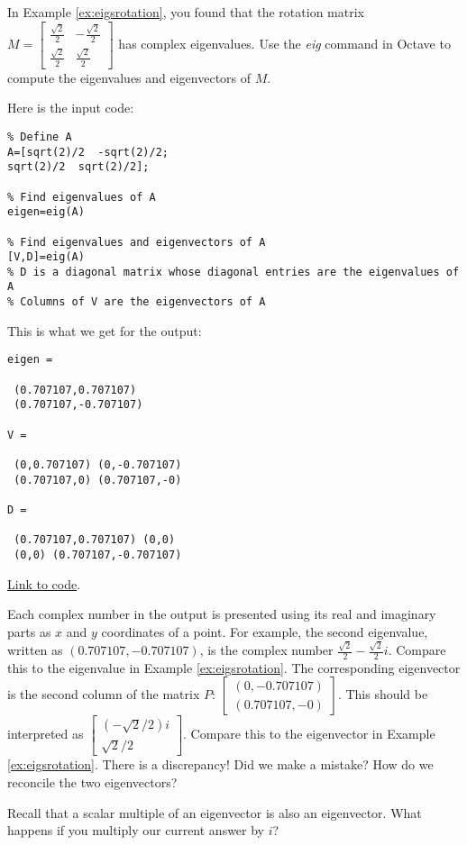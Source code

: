 \documentclass{ximera}
\begin{document}
\begin{example}\label{ex:complexEig}
In Example \ref{ex:eigsrotation}, you found that the rotation matrix $M=\begin{bmatrix}
\frac{\sqrt{2}}{2} & -\frac{\sqrt{2}}{2}\\
\frac{\sqrt{2}}{2} & \frac{\sqrt{2}}{2}
\end{bmatrix}$ has complex eigenvalues.  Use the \emph{eig} command in Octave to compute the eigenvalues and eigenvectors of $M$.  

\begin{explanation}
Here is the input code:

\begin{verbatim}
% Define A
A=[sqrt(2)/2  -sqrt(2)/2;
sqrt(2)/2  sqrt(2)/2];

% Find eigenvalues of A
eigen=eig(A)

% Find eigenvalues and eigenvectors of A
[V,D]=eig(A)
% D is a diagonal matrix whose diagonal entries are the eigenvalues of A
% Columns of V are the eigenvectors of A
\end{verbatim}

This is what we get for the output:
\begin{verbatim}
eigen =

 (0.707107,0.707107)
 (0.707107,-0.707107)

V =

 (0,0.707107) (0,-0.707107)
 (0.707107,0) (0.707107,-0)

D =

 (0.707107,0.707107) (0,0)
 (0,0) (0.707107,-0.707107)
\end{verbatim}

\href{https://sagecell.sagemath.org/?z=eJx1jkEKgzAURPeB3GE2AYWWgtviQio9ghtxEepXAzHBGNsev1FoKqXdfOY_ZoYRKKlThlBwVuT1PDmfZOkpA45Rnznb8SibwDkTuCrTglRP5i71QjNst7ZtJA83KdI_Rhl_unnr3sm6OpRNTAqUUMGLVsneGqkxSu_UE4_BzvShZAJdSx3BD_RjkcDF6mU02199GXcLXu8oVg4=&lang=octave&interacts=eJyLjgUAARUAuQ==}{Link to code}.

Each complex number in the output is presented using its real and imaginary parts as $x$ and $y$ coordinates of a point.  For example, the second eigenvalue, written as $(0.707107,-0.707107)$, is the complex number $\frac{\sqrt{2}}{2}-\frac{\sqrt{2}}{2}i$.  Compare this to the eigenvalue in Example \ref{ex:eigsrotation}.  The corresponding eigenvector is the second column of the matrix $P$: $\begin{bmatrix}(0,-0.707107)\\(0.707107,-0)\end{bmatrix}$.  This should be interpreted as $\begin{bmatrix}(-\sqrt{2}/2)i\\\sqrt{2}/2\end{bmatrix}$.  Compare this to the eigenvector in Example \ref{ex:eigsrotation}.  There is a discrepancy!  Did we make a mistake?  How do we reconcile the two eigenvectors?
\begin{hint}
    Recall that a scalar multiple of an eigenvector is also an eigenvector.  What happens if you multiply our current answer by $i$?
\end{hint}
\end{explanation}
\end{example}
\end{document}
